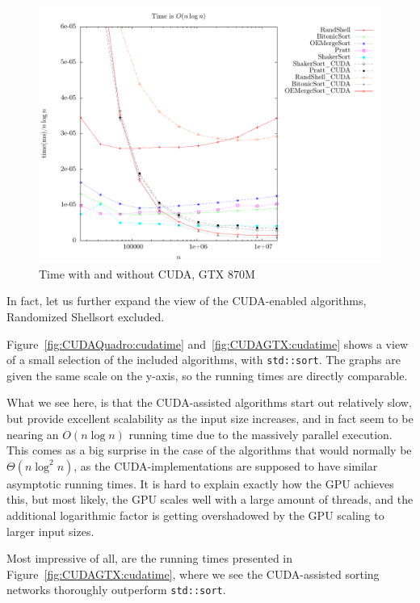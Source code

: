 \begin{figure}
\center
\includegraphics[width=\textwidth]{graphs/CUDAHueg/nlogntime.pdf}
\caption{Time with and without CUDA, GTX 870M}
\label{fig:CUDAGTX:time}
\end{figure}


In fact, let us further expand the view of the CUDA-enabled algorithms, Randomized Shellsort excluded.

Figure~\ref{fig:CUDAQuadro:cudatime} and~\ref{fig:CUDAGTX:cudatime} shows a view of a small selection of the included algorithms, with \texttt{std::sort}. The graphs are given the same scale on the y-axis, so the running times are directly comparable.

What we see here, is that the CUDA-assisted algorithms start out relatively slow, but provide excellent scalability as the input size increases, and in fact seem to be nearing an $O(n \log n)$ running time due to the massively parallel execution. This comes as a big surprise in the case of the algorithms that would normally be $\Theta(n \log^2 n)$, as the CUDA-implementations are supposed to have similar asymptotic running times. It is hard to explain exactly how the GPU achieves this, but most likely, the GPU scales well with a large amount of threads, and the additional logarithmic factor is getting overshadowed by the GPU scaling to larger input sizes.

Most impressive of all, are the running times presented in Figure~\ref{fig:CUDAGTX:cudatime}, where we see the CUDA-assisted sorting networks thoroughly outperform \texttt{std::sort}.


